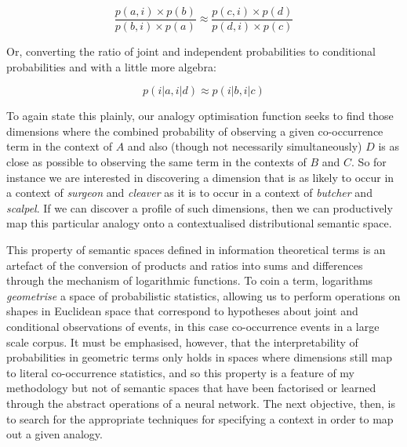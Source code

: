 \begin{equation}
\frac{p(a,i) \times p(b)}{p(b,i) \times p(a)} \approx \frac{p(c,i) \times p(d)}{p(d,i) \times p(c)}
\end{equation}

\noindent Or, converting the ratio of joint and independent probabilities to conditional probabilities and with a little more algebra:

\begin{equation}
p(i|a,i|d) \approx p(i|b,i|c)
\end{equation}

\noindent To again state this plainly, our analogy optimisation function seeks to find those dimensions where the combined probability of observing a given co-occurrence term in the context of $A$ and also (though not necessarily simultaneously) $D$ is as close as possible to observing the same term in the contexts of $B$ and $C$.  So for instance we are interested in discovering a dimension that is as likely to occur in a context of \emph{surgeon} and \emph{cleaver} as it is to occur in a context of \emph{butcher} and \emph{scalpel}.  If we can discover a profile of such dimensions, then we can productively map this particular analogy onto a contextualised distributional semantic space.

This property of semantic spaces defined in information theoretical terms is an artefact of the conversion of products and ratios into sums and differences through the mechanism of logarithmic functions.  To coin a term, logarithms \emph{geometrise} a space of probabilistic statistics, allowing us to perform operations on shapes in Euclidean space that correspond to hypotheses about joint and conditional observations of events, in this case co-occurrence events in a large scale corpus.  It must be emphasised, however, that the interpretability of probabilities in geometric terms only holds in spaces where dimensions still map to literal co-occurrence statistics, and so this property is a feature of my methodology but not of semantic spaces that have been factorised or learned through the abstract operations of a neural network.  The next objective, then, is to search for the appropriate techniques for specifying a context in order to map out a given analogy.

